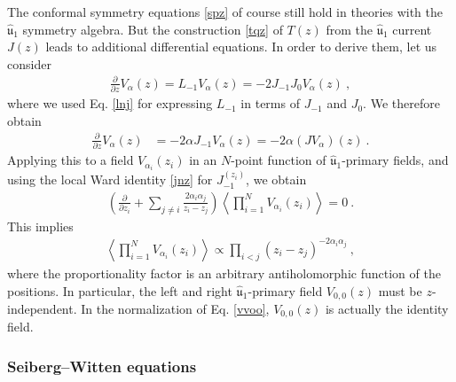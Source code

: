 \documentclass[12pt, a4paper, notitlepage, twoside]{report}
\numberwithin{equation}{section}
\theoremstyle{break}
\begin{document}
The conformal symmetry equations \eqref{spz} of course still hold in theories with the $\hat{\mathfrak{u}}_1$ symmetry algebra.
But the construction \eqref{tqz} of $T(z)$ from the $\hat{\mathfrak{u}}_1$ current $J(z)$ leads to additional differential equations.
In order to derive them, let us consider 
\begin{align}
 {\frac{\partial}{\partial z}} V_{\alpha}(z) = L_{-1}V_\alpha(z) = -2J_{-1}J_0 V_\alpha(z)\ ,
\end{align}
where we used Eq. \eqref{lnj} for expressing $L_{-1}$ in terms of $J_{-1}$ and $J_0$.
We therefore obtain
\begin{align}
{\frac{\partial}{\partial z}} V_{\alpha}(z)&= -2\alpha J_{-1}V_\alpha(z) = -2\alpha(JV_\alpha)(z)\ .
\label{pvaj}
\end{align}
Applying this to a field $V_{\alpha_i}(z_i)$ in an 
$N$-point function of $\hat{\mathfrak{u}}_1$-primary fields, and using 
the local Ward identity \eqref{jnz} for $J_{-1}^{(z_i)}$, we obtain 
\begin{align}
\left( {\frac{\partial}{\partial z_i}} +\sum_{j\neq i} \frac{2\alpha_i\alpha_j}{z_i-z_j} \right) \left\langle \prod_{i=1}^N V_{\alpha_i}(z_i) \right\rangle = 0 \ .
\label{kzl}
\end{align}
This implies 
\begin{align}
 \boxed{\left\langle \prod_{i=1}^N V_{\alpha_i}(z_i)\right\rangle  \propto \prod_{i<j} (z_i-z_j)^{-2\alpha_i\alpha_j}}\ ,
\label{pzz}
\end{align}
where the proportionality factor is an arbitrary antiholomorphic function of the positions.
In particular, the left and right $\hat{\mathfrak{u}}_1$-primary field $V_{0,0}(z)$ must be $z$-independent.
In the normalization of Eq. \eqref{vvoo}, $V_{0,0}(z)$ is actually the identity field.

\subsubsection{Seiberg--Witten equations}
\end{document}

